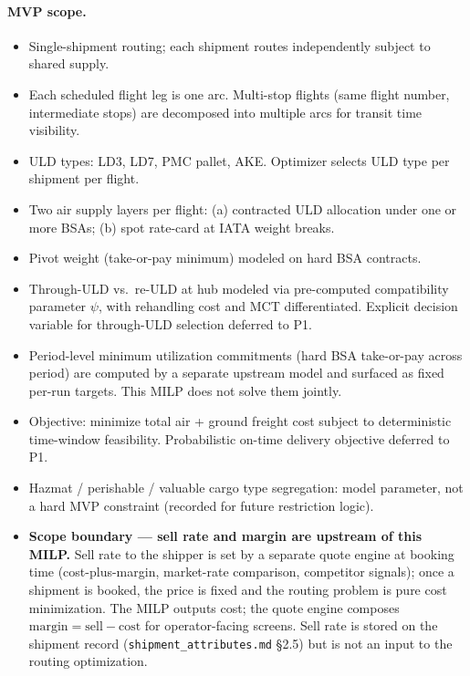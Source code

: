 \documentclass[11pt,a4paper]{article}
\theoremstyle{definition}
\begin{document}
\paragraph{MVP scope.}
\begin{itemize}[noitemsep]
  \item Single-shipment routing; each shipment routes independently subject to shared supply.
  \item Each scheduled flight leg is one arc. Multi-stop flights (same flight number, intermediate
        stops) are decomposed into multiple arcs for transit time visibility.
  \item ULD types: LD3, LD7, PMC pallet, AKE. Optimizer selects ULD type per shipment per flight.
  \item Two air supply layers per flight: (a) contracted ULD allocation under one or more BSAs;
        (b) spot rate-card at IATA weight breaks.
  \item Pivot weight (take-or-pay minimum) modeled on hard BSA contracts.
  \item Through-ULD vs.\ re-ULD at hub modeled via pre-computed compatibility parameter
        $\psi$, with rehandling cost and MCT differentiated. Explicit decision variable for
        through-ULD selection deferred to P1.
  \item Period-level minimum utilization commitments (hard BSA take-or-pay across period)
        are computed by a separate upstream model and surfaced as fixed per-run targets.
        This MILP does not solve them jointly.
  \item Objective: minimize total air + ground freight cost subject to deterministic
        time-window feasibility. Probabilistic on-time delivery objective deferred to P1.
  \item Hazmat / perishable / valuable cargo type segregation: model parameter, not a hard MVP
        constraint (recorded for future restriction logic).
  \item \textbf{Scope boundary --- sell rate and margin are upstream of this MILP.}
        Sell rate to the shipper is set by a separate quote engine at booking time
        (cost-plus-margin, market-rate comparison, competitor signals); once a shipment
        is booked, the price is fixed and the routing problem is pure cost
        minimization. The MILP outputs cost; the quote engine composes
        $\text{margin} = \text{sell} - \text{cost}$ for operator-facing screens. Sell
        rate is stored on the shipment record (\texttt{shipment\_attributes.md} \S2.5)
        but is not an input to the routing optimization.
\end{itemize}
\end{document}

